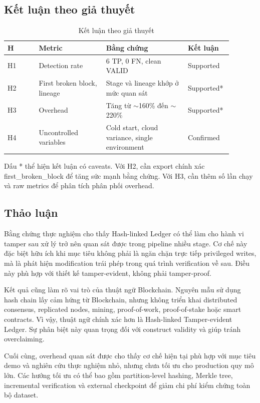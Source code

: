 \subsection{Kết luận theo giả thuyết}

\begin{table}[t]
\caption{Kết luận theo giả thuyết}
\centering
\begin{tabular}{p{0.13\linewidth}p{0.29\linewidth}p{0.34\linewidth}p{0.13\linewidth}}
\toprule
\textbf{H} & \textbf{Metric} & \textbf{Bằng chứng} & \textbf{Kết luận} \\
\midrule
H1 & Detection rate & 6 TP, 0 FN, clean VALID & Supported \\
H2 & First broken block, lineage & Stage và lineage khớp ở mức quan sát & Supported* \\
H3 & Overhead & Tăng từ $\sim$160\% đến $\sim$220\% & Supported* \\
H4 & Uncontrolled variables & Cold start, cloud variance, single environment & Confirmed \\
\bottomrule
\end{tabular}
\label{tab:hypothesis_conclusion}
\end{table}

Dấu * thể hiện kết luận có caveats. Với H2, cần export chính xác first\_broken\_block để tăng sức mạnh bằng chứng. Với H3, cần thêm số lần chạy và raw metrics để phân tích phân phối overhead.

\subsection{Thảo luận}

Bằng chứng thực nghiệm cho thấy Hash-linked Ledger có thể làm cho hành vi tamper sau xử lý trở nên quan sát được trong pipeline nhiều stage. Cơ chế này đặc biệt hữu ích khi mục tiêu không phải là ngăn chặn trực tiếp privileged writes, mà là phát hiện modification trái phép trong quá trình verification về sau. Điều này phù hợp với thiết kế tamper-evident, không phải tamper-proof.

Kết quả cũng làm rõ vai trò của thuật ngữ Blockchain. Nguyên mẫu sử dụng hash chain lấy cảm hứng từ Blockchain, nhưng không triển khai distributed consensus, replicated nodes, mining, proof-of-work, proof-of-stake hoặc smart contracts. Vì vậy, thuật ngữ chính xác hơn là Hash-linked Tamper-evident Ledger. Sự phân biệt này quan trọng đối với construct validity và giúp tránh overclaiming.

Cuối cùng, overhead quan sát được cho thấy cơ chế hiện tại phù hợp với mục tiêu demo và nghiên cứu thực nghiệm nhỏ, nhưng chưa tối ưu cho production quy mô lớn. Các hướng tối ưu có thể bao gồm partition-level hashing, Merkle tree, incremental verification và external checkpoint để giảm chi phí kiểm chứng toàn bộ dataset.
